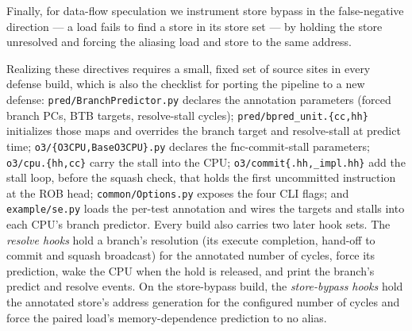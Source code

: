 \notebr
Finally, for data-flow speculation we instrument store bypass in the false-negative direction --- a load fails to find a store in its store set --- by holding the store unresolved and forcing the aliasing load and store to the same address.
\notebr

Realizing these directives requires a small, fixed set of source sites in every defense build, which is also the checklist for porting the pipeline to a new defense: \texttt{pred/BranchPredictor.py} declares the annotation parameters (forced branch PCs, BTB targets, resolve-stall cycles); \texttt{pred/bpred\_unit.\{cc,hh\}} initializes those maps and overrides the branch target and resolve-stall at predict time; \texttt{o3/\{O3CPU,BaseO3CPU\}.py} declares the fnc-commit-stall parameters; \texttt{o3/cpu.\{hh,cc\}} carry the stall into the CPU; \texttt{o3/commit\{.hh,\_impl.hh\}} add the stall loop, before the squash check, that holds the first uncommitted instruction at the ROB head; \texttt{common/Options.py} exposes the four CLI flags; and \texttt{example/se.py} loads the per-test annotation and wires the targets and stalls into each CPU's branch predictor. Every build also carries two later hook sets. The \emph{resolve hooks} hold a branch's resolution (its execute completion, hand-off to commit and squash broadcast) for the annotated number of cycles, force its prediction, wake the CPU when the hold is released, and print the branch's predict and resolve events. On the store-bypass build, the \emph{store-bypass hooks} hold the annotated store's address generation for the configured number of cycles and force the paired load's memory-dependence prediction to no alias.
\notebr
{}

